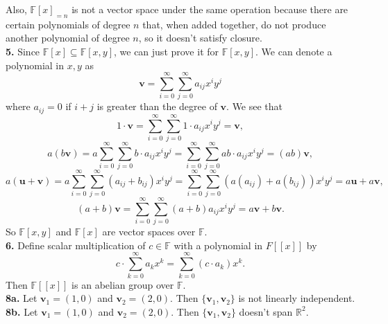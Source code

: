 \documentclass{article}
\newcommand{\bv}{\mathbf{v}}
\newcommand{\bu}{\mathbf{u}}
\newcommand{\R}{\mathbb{R}}
\newcommand{\F}{\mathbb{F}}
\begin{document}
Also, $\F[x]_{=n}$ is not a vector space under the same operation because there are certain polynomials of degree $n$ that, when added together, do not produce another polynomial of degree $n$, so it doesn't satisfy closure. \\

\textbf{5.} Since $\F[x] \subseteq \F[x, y]$, we can just prove it for $\F[x, y]$. We can denote a polynomial in $x, y$ as
$$\bv = \sum_{i = 0}^\infty\sum_{j = 0}^\infty a_{ij}x^iy^j$$
where $a_{ij} = 0$ if $i + j$ is greater than the degree of $\bv$. We see that
$$1\cdot \bv = \sum_{i = 0}^\infty\sum_{j = 0}^\infty 1\cdot a_{ij}x^iy^j = \bv,$$
$$a(b\bv) = a\sum_{i = 0}^\infty\sum_{j = 0}^\infty b\cdot a_{ij}x^iy^j = \sum_{i = 0}^\infty\sum_{j = 0}^\infty ab\cdot a_{ij}x^iy^j = (ab)\bv,$$
$$a(\bu + \bv) = a\sum_{i = 0}^\infty\sum_{j = 0}^\infty (a_{ij} + b_{ij})x^iy^j = \sum_{i = 0}^\infty\sum_{j = 0}^\infty (a(a_{ij}) + a(b_{ij}))x^iy^j = a\bu + a\bv,$$
$$(a + b)\bv = \sum_{i = 0}^\infty\sum_{j = 0}^\infty (a + b)a_{ij}x^iy^j = a\bv + b\bv.$$
So $\F[x, y]$ and $\F[x]$ are vector spaces over $\F$. \\

\textbf{6.} Define scalar multiplication of $c \in \F$ with a polynomial in $F[[x]]$ by
$$c\cdot \sum_{k=0}^\infty a_kx^k = \sum_{k=0}^\infty (c\cdot a_k)x^k.$$
Then $\F[[x]]$ is an abelian group over $\F$. \\

\textbf{8a.} Let $\bv_1 = (1, 0)$ and $\bv_2 = (2, 0)$. Then $\{\bv_1, \bv_2\}$ is not linearly independent. \\

\textbf{8b.} Let $\bv_1 = (1, 0)$ and $\bv_2 = (2, 0)$. Then $\{\bv_1, \bv_2\}$ doesn't span $\R^2$. \\
\end{document}
